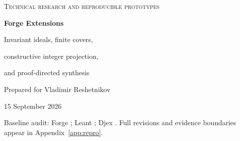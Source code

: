 \documentclass[11pt,a4paper]{article}
\newcommand{\code}[1]{\texttt{\detokenize{#1}}}
\theoremstyle{definition}
\theoremstyle{remark}
\begin{document}
\begin{titlepage}
\color{Ink}
\noindent\textsc{Technical research and reproducible prototypes}\par
\vspace{1.4cm}
{\Huge\bfseries Forge Extensions\par}
\vspace{0.6cm}
{\LARGE Invariant ideals, finite covers,\par constructive integer projection,\par and proof-directed synthesis\par}
\vspace{1cm}
{\large Prepared for Vladimir Reshetnikov\par}
{\large 15 September 2026\par}
\vspace{1cm}
\color{black}
\begin{abstract}
Forge already has a broad design for proof planning above Lean's \code{grind}.
This article develops additional algorithms rather than another description of
that architecture. The central addition computes the greatest finite-dimensional
space of invariant generators whose transition pullbacks admit degree-bounded
polynomial multipliers. A descending linear-algebra calculation replaces the
apparently bilinear simultaneous search for generators and multipliers. Two
further workers prove properties of all finite recursively constructed trees by
finite-algebra covers, and eliminate one existential integer variable while
constructing a symbolic witness without modulus-sized residue tables. A fourth,
unimplemented integration proposal decomposes higher-order synthesis into
proof-directed fold contracts, motivated by a specific open composition problem
in Leant and Djex.

The archive contains exact standard-library Python implementations, checks of
\ConstCertificates{} constant-multiplier packets, \IdealCertificates{}
polynomial-multiplier packets, \FiniteCertificates{} finite-algebra certificates,
and \IntegerCertificates{} symbolic integer projections. It also contains
\UnitTestCount{} passing test methods, a differential integer experiment with
\IntegerValuations{} concrete parameter valuations, and explicit incompleteness
and corruption controls. These are Python-checked research artifacts, not Lean
kernel proofs or a measured improvement over an existing tactic. The mathematical
soundness and fragment-completeness claims are proved in the text; the remaining
Lean implementation work is specified separately.
\end{abstract}
\vfill
\noindent\small Baseline audit: Forge \code{6745210}; Leant \code{6bf05ad}; Djex
\code{e8778f4}. Full revisions and evidence boundaries appear in Appendix~\ref{app:repro}.
\end{titlepage}
{\small\tableofcontents}
\clearpage
\end{document}
